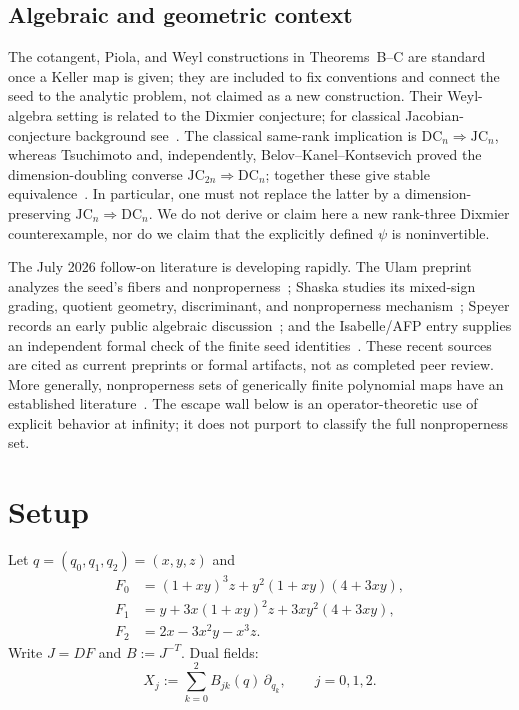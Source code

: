 ﻿\documentclass[11pt]{article}
\begin{document}
\subsection*{Algebraic and geometric context}
The cotangent, Piola, and Weyl constructions in Theorems~B--C are standard
once a Keller map is given; they are included to fix conventions and connect
the seed to the analytic problem, not claimed as a new construction. Their
Weyl-algebra setting is related to the Dixmier conjecture; for classical
Jacobian-conjecture background see~\cite{BassCW}. The classical
same-rank implication is \(\mathrm{DC}_n\Rightarrow\mathrm{JC}_n\), whereas
Tsuchimoto and, independently, Belov--Kanel--Kontsevich proved the
dimension-doubling converse
\(\mathrm{JC}_{2n}\Rightarrow\mathrm{DC}_n\); together these give stable
equivalence~\cite{Tsuchimoto2005,BKK2007,AdjamagboEssen2007}. In particular,
one must not replace the latter by a dimension-preserving
\(\mathrm{JC}_n\Rightarrow\mathrm{DC}_n\). We do not derive or claim here a
new rank-three Dixmier counterexample, nor do we claim that the explicitly
defined \(\psi\) is noninvertible.

The July 2026 follow-on literature is developing rapidly. The Ulam preprint
analyzes the seed's fibers and nonproperness~\cite{UlamJacobian}; Shaska studies
its mixed-sign grading, quotient geometry, discriminant, and nonproperness
mechanism~\cite{Shaska2026}; Speyer records an early public algebraic
discussion~\cite{SpeyerJC2026}; and the Isabelle/AFP entry supplies an independent
formal check of the finite seed identities~\cite{AFPJacobian}. These recent
sources are cited as current preprints or formal artifacts, not as completed
peer review. More generally, nonproperness sets of generically finite
polynomial maps have an established literature~\cite{JelonekLason2018}. The
escape wall below is an operator-theoretic use of explicit behavior at
infinity; it does not purport to classify the full nonproperness set.

\section{Setup}
Let \(q=(q_0,q_1,q_2)=(x,y,z)\) and
\begin{align*}
F_0&=(1+xy)^3 z + y^2(1+xy)(4+3xy),\\
F_1&=y + 3x(1+xy)^2 z + 3xy^2(4+3xy),\\
F_2&=2x - 3x^2 y - x^3 z.
\end{align*}
Write \(J=DF\) and \(B:=J^{-T}\). Dual fields:
\[
X_j:=\sum_{k=0}^{2} B_{jk}(q)\,\partial_{q_k},\qquad j=0,1,2.
\]
\end{document}
